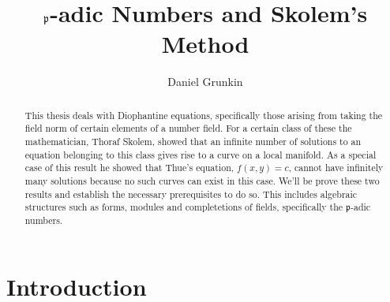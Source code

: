 \documentclass{article}
\title{$\mfrak p$-adic Numbers and Skolem's Method}
\author{Daniel Grunkin}
\date{}
\newcommand{\mfrak}[1]{\mathfrak{#1}}
\numberwithin{equation}{section}
\begin{document}
\begin{abstract}
	This thesis deals with Diophantine equations, specifically those arising from taking the field norm of certain elements of a number field. For a certain class of these the mathematician, Thoraf Skolem, showed that an infinite number of solutions to an equation belonging to this class gives rise to a curve on a local manifold. As a special case of this result he showed that Thue's equation, $f(x,y) = c$, cannot have infinitely many solutions because no such curves can exist in this case. We'll be prove these two results and establish the necessary prerequisites to do so. This includes algebraic structures such as forms, modules and completetions of fields, specifically the $\mfrak p$-adic numbers.
\end{abstract}
\maketitle



\tableofcontents
\newpage



\section{Introduction}
\end{document}
